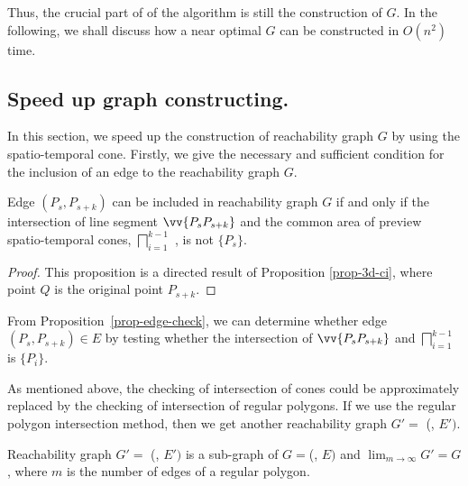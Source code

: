Thus, the crucial part of of the algorithm is still the construction of $G$. 
In the following, we shall discuss how a near optimal $G$ can be constructed in $O(n^2)$ time.


\subsection{Speed up graph constructing.} %
In this section, we speed up the construction of reachability graph $G$ by using the spatio-temporal cone.
Firstly, we give the necessary and sufficient condition for the inclusion of an edge to the reachability graph $G$.

\begin{prop}
\label{prop-edge-check}
Edge $(P_{s}, P_{s+k})$ can be included in reachability graph $G$ if and only if the intersection of line segment $\vv{P_{s}P_{s+k}}$ and 
the common area of preview spatio-temporal cones, \ie $\bigsqcap_{i=1}^{k-1}$ , is not $\{P_s\}$.
\end{prop}

\begin{proof}
This proposition is a directed result of Proposition \ref{prop-3d-ci}, where point $Q$ is the original point $P_{s+k}$. 
\end{proof}


From Proposition~\ref{prop-edge-check}, we can determine whether edge $(P_s, P_{s+k}) \in E$ by testing whether the intersection of $\vv{P_sP_{s+k}}$ and $\bigsqcap_{i=1}^{k - 1}$ is $\{P_i\}$. 


As mentioned above, the checking of intersection of cones could be approximately replaced by the checking of intersection of regular polygons. 
If we use the regular polygon intersection method, then we get another reachability graph $G'=$ (, $E')$.

\begin{prop}
	\label{prop-near-opt-graph}
	Reachability graph $G'=$ (, $E')$ is a sub-graph of $G=$(, $E)$ and $\lim_{m \to \infty}{G'=G}$, where $m$ is the number of edges of a regular polygon.
\end{prop}


